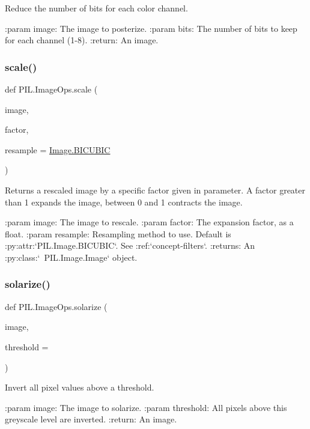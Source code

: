 \begin{DoxyVerb}Reduce the number of bits for each color channel.

:param image: The image to posterize.
:param bits: The number of bits to keep for each channel (1-8).
:return: An image.
\end{DoxyVerb}
 \mbox{\label{namespacePIL_1_1ImageOps_abd1f30ecd4e0780752fb7b161ea36bc9}} 
\subsubsection{\texorpdfstring{scale()}{scale()}}
{\footnotesize\ttfamily def P\+I\+L.\+Image\+Ops.\+scale (\begin{DoxyParamCaption}\item[{}]{image,  }\item[{}]{factor,  }\item[{}]{resample = {\ttfamily \hyperlink{namespacePIL_1_1Image_a3824ac5a0532aa60f7072af889d88e59}{Image.\+B\+I\+C\+U\+B\+IC}} }\end{DoxyParamCaption})}

\begin{DoxyVerb}Returns a rescaled image by a specific factor given in parameter.
A factor greater than 1 expands the image, between 0 and 1 contracts the
image.

:param image: The image to rescale.
:param factor: The expansion factor, as a float.
:param resample: Resampling method to use. Default is
                 :py:attr:`PIL.Image.BICUBIC`. See :ref:`concept-filters`.
:returns: An :py:class:`~PIL.Image.Image` object.
\end{DoxyVerb}
 \mbox{\label{namespacePIL_1_1ImageOps_a50420e7239e43ed1ed190fdf84771bcc}} 
\subsubsection{\texorpdfstring{solarize()}{solarize()}}
{\footnotesize\ttfamily def P\+I\+L.\+Image\+Ops.\+solarize (\begin{DoxyParamCaption}\item[{}]{image,  }\item[{}]{threshold = {} }\end{DoxyParamCaption})}

\begin{DoxyVerb}Invert all pixel values above a threshold.

:param image: The image to solarize.
:param threshold: All pixels above this greyscale level are inverted.
:return: An image.
\end{DoxyVerb}
 